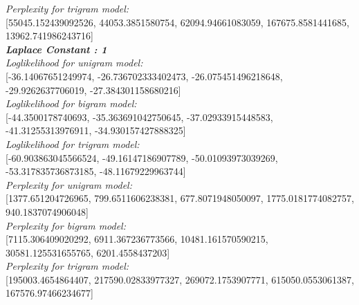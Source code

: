 \documentclass[11ppt]{article}
\begin{document}
\textit{Perplexity for trigram model:} \\ \vspace{1mm}  [55045.152439092526, 44053.3851580754, 62094.94661083059, 167675.8581441685, 13962.741986243716]  \\ \vspace{2mm}
\textit{\textbf{Laplace Constant : 1 }}\\ \vspace{2mm}
\textit{Loglikelihood for unigram model:} \\ \vspace{1mm}  [-36.14067651249974, -26.736702333402473, -26.075451496218648, -29.9262637706019, -27.384301158680216]  \\ \vspace{2mm}
\textit{Loglikelihood for bigram model:} \\ \vspace{1mm}  [-44.3500178740693, -35.363691042750645, -37.02933915448583, -41.31255313976911, -34.930157427888325]  \\ \vspace{2mm}
\textit{Loglikelihood for trigram model:} \\ \vspace{1mm}  [-60.903863045566524, -49.16147186907789, -50.01093973039269, -53.317835736873185, -48.11679229963744]  \\ \vspace{2mm}
\textit{Perplexity for unigram model:} \\ \vspace{1mm}  [1377.651204726965, 799.6511606238381, 677.8071948050097, 1775.0181774082757, 940.1837074906048]  \\ \vspace{2mm}
\textit{Perplexity for bigram model:} \\ \vspace{1mm}  [7115.306409020292, 6911.367236773566, 10481.161570590215, 30581.125531655765, 6201.4558437203]  \\ \vspace{2mm}
\textit{Perplexity for trigram model:} \\ \vspace{1mm}  [195003.4654864407, 217590.02833977327, 269072.1753907771, 615050.0553061387, 167576.97466234677]  \\ 
\vspace{4mm}
\end{document}
